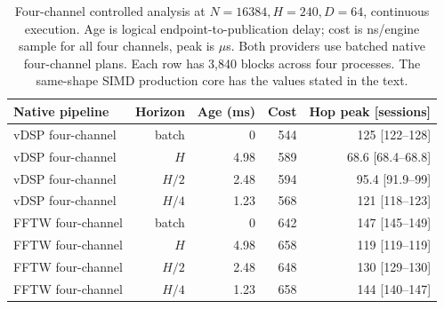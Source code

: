 \begin{table}[htbp]
\centering\small
\begin{tabular}{@{}lrrrr@{}}
\toprule
Native pipeline & Horizon & Age (ms) & Cost & Hop peak [sessions] \\
\midrule
vDSP four-channel & batch & 0 & 544 & 125 [122--128] \\
vDSP four-channel & $H$ & 4.98 & 589 & 68.6 [68.4--68.8] \\
vDSP four-channel & $H/2$ & 2.48 & 594 & 95.4 [91.9--99] \\
vDSP four-channel & $H/4$ & 1.23 & 568 & 121 [118--123] \\
FFTW four-channel & batch & 0 & 642 & 147 [145--149] \\
FFTW four-channel & $H$ & 4.98 & 658 & 119 [119--119] \\
FFTW four-channel & $H/2$ & 2.48 & 648 & 130 [129--130] \\
FFTW four-channel & $H/4$ & 1.23 & 658 & 144 [140--147] \\
\bottomrule
\end{tabular}
\caption{Four-channel controlled analysis at $N=16384,H=240,D=64$, continuous execution. Age is logical endpoint-to-publication delay; cost is ns/engine sample for all four channels, peak is $\mu$s. Both providers use batched native four-channel plans. Each row has 3,840 blocks across four processes. The same-shape SIMD production core has the values stated in the text.}
\label{tab:study-horizons}
\end{table}
